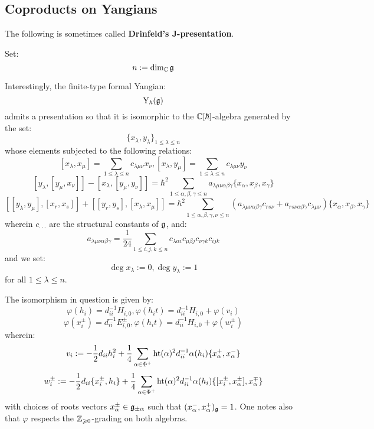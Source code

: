     \subsection{Coproducts on Yangians}
         
         The following is sometimes called \textbf{Drinfeld's J-presentation}.
        \begin{lemma} \label{lemma: drinfeld_presentation_for_finite_type_yangians}
            Set:
                $$n := \dim_{\mathbb{C}} \mathfrak{g}$$
        
            Interestingly, the finite-type formal Yangian:
                $$\mathrm{Y}_{\hbar}(\mathfrak{g})$$
            admits a presentation so that it is isomorphic to the $\mathbb{C}[\hbar]$-algebra generated by the set:
                $$\{ x_{\lambda}, y_{\lambda} \}_{1 \leq \lambda \leq n}$$
            whose elements subjected to the following relations:
                $$[ x_{\lambda}, x_{\mu} ] = \sum_{1 \leq \lambda \leq n} c_{\lambda \mu \nu} x_{\nu}, [ x_{\lambda}, y_{\mu} ] = \sum_{1 \leq \lambda \leq n} c_{\lambda \mu \nu} y_{\nu}$$
                $$[ y_{\lambda}, [y_{\mu}, x_{\nu}] ] - [ x_{\lambda}, [y_{\mu}, y_{\nu}] ] = \hbar^2 \sum_{1 \leq \alpha, \beta, \gamma \leq n} a_{\lambda \mu \nu \alpha \beta \gamma} \{ x_{\alpha}, x_{\beta}, x_{\gamma} \}$$
                $$[ [y_{\lambda}, y_{\mu}], [x_r, x_s] ] + [ [y_r, y_s], [x_{\lambda}, x_{\mu}] ] = \hbar^2 \sum_{1 \leq \alpha, \beta, \gamma, \nu \leq n} ( a_{\lambda \mu \nu \alpha \beta \gamma} c_{r s \nu} + a_{r s \nu \alpha \beta \gamma} c_{\lambda \mu \nu} ) \{ x_{\alpha}, x_{\beta}, x_{\gamma} \}$$
            wherein $c_{\cdot \cdot \cdot}$ are the structural constants of $\mathfrak{g}$, and:
                $$a_{\lambda \mu \nu \alpha \beta \gamma} = \frac{1}{24} \sum_{1 \leq i, j, k \leq n} c_{\lambda \alpha i} c_{\mu \beta j} c_{\nu \gamma k} c_{i j k}$$
            and we set:
                $$\deg x_{\lambda} := 0, \deg y_{\lambda} := 1$$
            for all $1 \leq \lambda \leq n$.
            
            The isomorphism in question is given by:
                $$\varphi(h_i) = d_{ii}^{-1} H_{i, 0}, \varphi(h_i t) = d_{ii}^{-1} H_{i, 0} + \varphi(v_i)$$
                $$\varphi(x_i^{\pm}) = d_{ii}^{-1} E_{i, 0}^{\pm}, \varphi(h_i t) = d_{ii}^{-1} H_{i, 0} + \varphi(w_i^{\pm})$$
            wherein:
                $$v_i := -\frac12 d_{ii} h_i^2 + \frac14 \sum_{\alpha \in \Phi^+} \operatorname{ht}(\alpha)^2 d_{ii}^{-1} \alpha(h_i) \{x_{\alpha}^+, x_{\alpha}^-\}$$
                $$w_i^{\pm} := -\frac12 d_{ii} \{x_i^{\pm}, h_i\} + \frac14 \sum_{\alpha \in \Phi^+} \operatorname{ht}(\alpha)^2 d_{ii}^{-1} \alpha(h_i) \{[x_i^{\pm}, x_{\alpha}^{\pm}], x_{\alpha}^{\mp}\}$$
            with choices of roots vectors $x_{\alpha}^{\pm} \in \mathfrak{g}_{\pm \alpha}$ such that $(x_{\alpha}^-, x_{\alpha}^+)_{\mathfrak{g}} = 1$. One notes also that $\varphi$ respects the $\mathbb{Z}_{\geqslant 0}$-grading on both algebras.
        \end{lemma}
